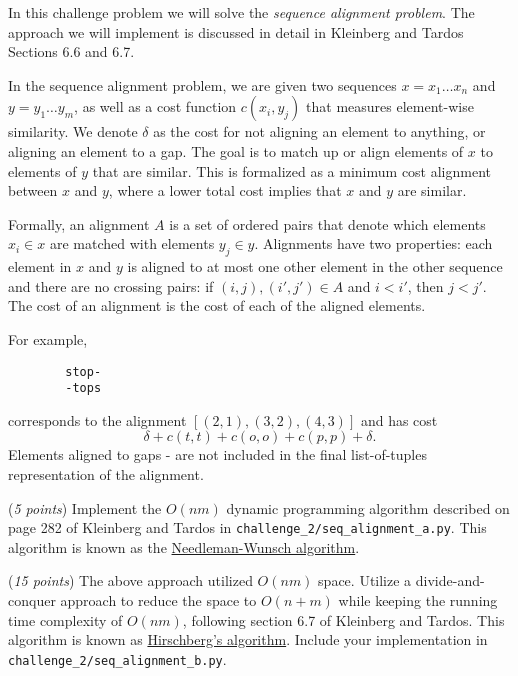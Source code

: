 \documentclass{hw_template}
\begin{document}

\begin{challenge}
    In this challenge problem we will solve the {\em sequence alignment problem}. The approach we will implement is discussed in detail in Kleinberg and Tardos Sections 6.6 and 6.7.
    
    In the sequence alignment problem, we are given two sequences $x=x_1\ldots x_n$ and
    $y=y_1\ldots y_m$, as well as a cost function $c(x_i,y_j)$ that measures element-wise similarity.
    We denote $\delta$ as the cost for not aligning an element to anything,
    or aligning an element to a gap.
    The goal is to match up or align elements of $x$ to elements of $y$ that are similar.
    This is formalized as a minimum cost alignment between $x$ and $y$,
    where a lower total cost implies that $x$ and $y$ are similar.
    
    Formally, an alignment $A$ is a set of ordered pairs that denote which elements $x_i \in x$ are matched with elements $y_j \in y$.
    Alignments have two properties:
    each element in $x$ and $y$ is aligned to at most one other element in the other sequence
    and there are no crossing pairs: if $(i, j), (i', j') \in A$ and $i < i'$, then $j < j'$.
    The cost of an alignment is the cost of each of the aligned elements. 
    
    For example,
    \begin{verbatim}
        stop-
        -tops
    \end{verbatim}
    corresponds to the alignment $[(2,1), (3,2), (4,3)]$ and has cost
    $$\delta + c(t,t) + c(o,o) + c(p,p) + \delta.$$
    Elements aligned to gaps - are not included in the final list-of-tuples representation of the alignment.
    

\begin{subproblem}
(\textit{5 points})
Implement the $O(nm)$ dynamic programming algorithm described on page 282 of Kleinberg and Tardos in \texttt{challenge\_2/seq\_alignment\_a.py}.
This algorithm is known as the \href{https://en.wikipedia.org/wiki/Needleman-Wunsch\_algorithm}{Needleman-Wunsch algorithm}.
\end{subproblem}

\begin{subproblem}
(\textit{15 points})
The above approach utilized $O(nm)$ space.
Utilize a divide-and-conquer approach to reduce the space to $O(n+m)$
while keeping the running time complexity of $O(nm)$,
following section 6.7 of Kleinberg and Tardos.
This algorithm is known as \href{https://en.wikipedia.org/wiki/Hirschberg's\_algorithm}{Hirschberg's algorithm}.
Include your implementation in \texttt{challenge\_2/seq\_alignment\_b.py}.
\end{subproblem}


\end{challenge}
\end{document}
